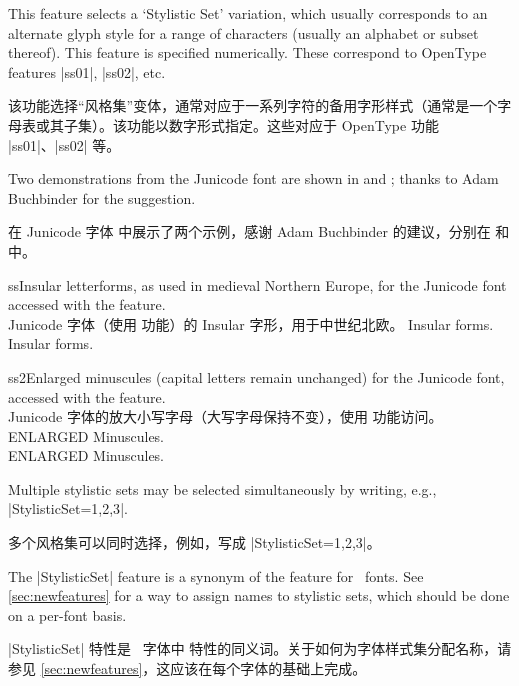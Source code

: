 \documentclass[a4paper]{l3doc}
\begin{document}
This feature selects a `Stylistic Set' variation,
which usually corresponds to an alternate glyph style for a range of
characters (usually an alphabet or subset thereof).
This feature is specified numerically. These correspond to OpenType
features |ss01|, |ss02|, etc.

该功能选择“风格集”变体，通常对应于一系列字符的备用字形样式（通常是一个字母表或其子集）。该功能以数字形式指定。这些对应于 OpenType 功能 |ss01|、|ss02| 等。

Two demonstrations from the Junicode
font
are shown in  and ; thanks to Adam
Buchbinder for the suggestion.

在 Junicode 字体 中展示了两个示例，感谢 Adam Buchbinder 的建议，分别在  和  中。

\begin{Lexample}{ss}{Insular letterforms, as used in medieval Northern Europe, for the Junicode font accessed with the  feature.\\Junicode 字体（使用  功能）的 Insular 字形，用于中世纪北欧。}
   Insular forms. \\
   Insular forms. \\
\end{Lexample}

\begin{Lexample}{ss2}{Enlarged minuscules (capital letters remain unchanged) for the Junicode font, accessed with the  feature.\\Junicode 字体的放大小写字母（大写字母保持不变），使用  功能访问。}
   ENLARGED Minuscules. \\
   ENLARGED Minuscules. \\
\end{Lexample}

Multiple stylistic sets may be selected simultaneously by writing, e.g.,
|StylisticSet={1,2,3}|.

多个风格集可以同时选择，例如，写成 |StylisticSet={1,2,3}|。

The |StylisticSet| feature is a synonym of the  feature for \AAT\ fonts.
See \vref{sec:newfeatures} for a way to assign names to stylistic sets, which should be done on a per-font basis.

|StylisticSet| 特性是 \AAT\ 字体中  特性的同义词。关于如何为字体样式集分配名称，请参见 \vref{sec:newfeatures}，这应该在每个字体的基础上完成。
\end{document}
